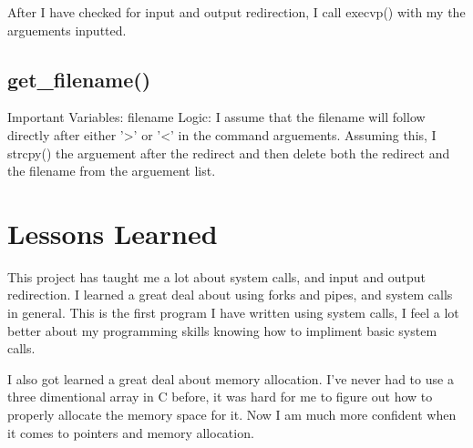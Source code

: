 \documentclass[a4paper, 12pt]{article}
\begin{document}
After I have checked for input and output redirection, I call execvp() with my the arguements inputted.
\subsection{get\_filename()}
Important Variables:
filename
Logic:
I assume that the filename will follow directly after either '>' or '<' in the command arguements. Assuming this, I strcpy() the arguement after the redirect and then delete both the redirect and the filename from the arguement list.

\section{Lessons Learned}

This project has taught me a lot about system calls, and input and output redirection. I learned a great deal about using forks and pipes, and system calls in general. This is the first program I have written using system calls, I feel a lot better about my programming skills knowing how to impliment basic system calls.

I also got learned a great deal about memory allocation. I've never had to use a three dimentional array in C before, it was hard for me to figure out how to properly allocate the memory space for it. Now I am much more confident when it comes to pointers and memory allocation.
\end{document}

